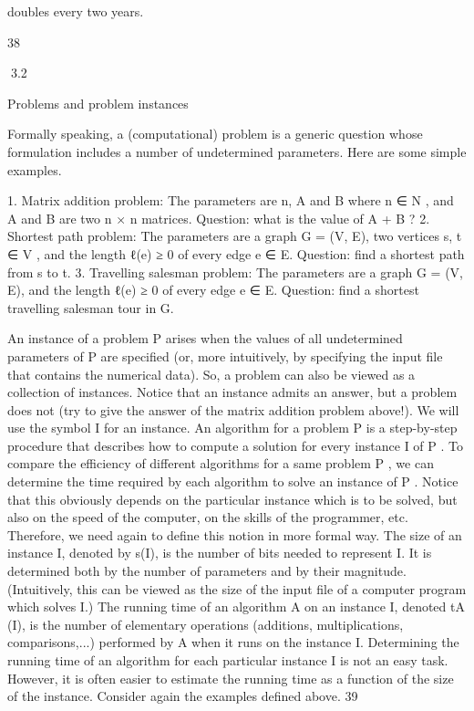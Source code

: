 \documentclass[titlepage]{book}
\theoremstyle{plain}
\theoremstyle{definition}
\theoremstyle{remark}
\begin{document}
doubles every two years.

38

3.2

Problems and problem instances

Formally speaking, a (computational) problem is a generic question whose formulation includes a number
of undetermined parameters. Here are some simple examples.

1. Matrix addition problem: The parameters are n, A and B where n ∈ N , and A and B are two n × n
matrices. Question: what is the value of A + B ?
2. Shortest path problem: The parameters are a graph G = (V, E), two vertices s, t ∈ V , and the
length ℓ(e) ≥ 0 of every edge e ∈ E. Question: find a shortest path from s to t.
3. Travelling salesman problem: The parameters are a graph G = (V, E), and the length ℓ(e) ≥ 0 of
every edge e ∈ E. Question: find a shortest travelling salesman tour in G.

An instance of a problem P arises when the values of all undetermined parameters of P are specified (or,
more intuitively, by specifying the input file that contains the numerical data). So, a problem can also
be viewed as a collection of instances. Notice that an instance admits an answer, but a problem does not
(try to give the answer of the matrix addition problem above!). We will use the symbol I for an instance.
An algorithm for a problem P is a step-by-step procedure that describes how to compute a solution for
every instance I of P . To compare the efficiency of different algorithms for a same problem P , we can
determine the time required by each algorithm to solve an instance of P . Notice that this obviously
depends on the particular instance which is to be solved, but also on the speed of the computer, on the
skills of the programmer, etc. Therefore, we need again to define this notion in more formal way.
The size of an instance I, denoted by s(I), is the number of bits needed to represent I. It is determined
both by the number of parameters and by their magnitude. (Intuitively, this can be viewed as the size
of the input file of a computer program which solves I.)
The running time of an algorithm A on an instance I, denoted tA (I), is the number of elementary
operations (additions, multiplications, comparisons,...) performed by A when it runs on the instance I.
Determining the running time of an algorithm for each particular instance I is not an easy task. However,
it is often easier to estimate the running time as a function of the size of the instance.
Consider again the examples defined above.
39
\end{document}
